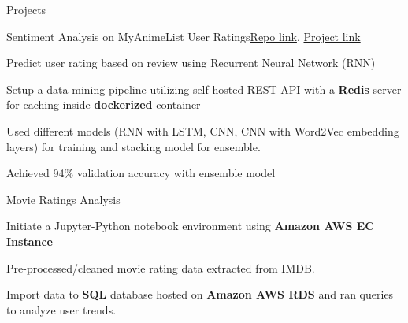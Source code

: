 \documentclass{resume} %
\begin{document}
\begin{rSection}{Projects}
    \begin{rSubsection}{Sentiment Analysis on MyAnimeList User Ratings}{}{\href{https://github.com/n0k0m3/rnn-mal-sentiment}{Repo link}, \href{https://colab.research.google.com/github/n0k0m3/rnn-mal-sentiment/blob/main/main.ipynb}{Project link}}{}
        \item Predict user rating based on review using Recurrent Neural Network (RNN)
        \item Setup a data-mining pipeline utilizing self-hosted REST API with a \textbf{Redis} server for caching inside \textbf{dockerized} container
        \item Used different models (RNN with LSTM, CNN, CNN with Word2Vec embedding layers) for training and stacking model for ensemble.
        \item Achieved 94\% validation accuracy with ensemble model
    \end{rSubsection}

    \begin{rSubsection}{Movie Ratings Analysis}{}{}{}
        \item Initiate a Jupyter-Python notebook environment using \textbf{Amazon AWS EC Instance}
        \item Pre-processed/cleaned movie rating data extracted from IMDB.
        \item Import data to \textbf{SQL} database hosted on \textbf{Amazon AWS RDS} and ran queries to analyze user trends.
    \end{rSubsection}


\end{rSection}
\end{document}
